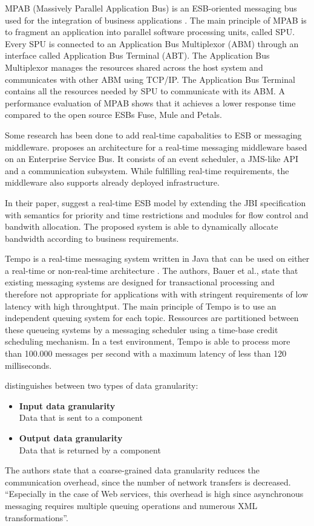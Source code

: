 MPAB (Massively Parallel Application Bus) is an ESB-oriented messaging bus used for the integration of business applications \citep{Benosman:2012zr}. The main principle of MPAB is to fragment an application into parallel software processing units, called SPU. Every SPU is connected to an Application Bus Multiplexor (ABM) through an interface called Application Bus Terminal (ABT). The Application Bus Multiplexor manages the resources shared across the host system and communicates with other ABM using TCP/IP. The Application Bus Terminal contains all the resources needed by SPU to communicate with its ABM. A performance evaluation of MPAB shows that it achieves a lower response time compared to the open source ESBs Fuse, Mule and Petals.

Some research has been done to add real-time capabalities to ESB or messaging middleware. \cite{Garces-Erice:2009kx} proposes an architecture for a real-time messaging middleware based on an Enterprise Service Bus. It consists of an event scheduler, a \ac{JMS}-like API and a communication subsystem. While fulfilling real-time requirements, the middleware also supports already deployed infrastructure.

In their paper, \cite{Xia:2011rt} suggest a real-time ESB model by extending the JBI specification with semantics for priority and time restrictions and modules for flow control and bandwith allocation. The proposed system is able to dynamically allocate bandwidth according to business requirements.

Tempo is a real-time messaging system written in Java that can be used on either a real-time or non-real-time architecture \citep{Bauer:2008fk}. The authors, Bauer et al., state that existing messaging systems are designed for transactional processing and therefore not appropriate for applications with with stringent requirements of low latency with high throughtput. The main principle of Tempo is to use an independent queuing system for each topic. Ressources are partitioned between these queueing systems by a messaging scheduler using a time-base credit scheduling mechanism. In a test environment, Tempo is able to process more than 100.000 messages per second with a maximum latency of less than 120 milliseconds.

\cite{Haesen:2008ve} distinguishes between two types of data granularity:
\begin{itemize}
	\item \textbf{Input data granularity}\\
	Data that is sent to a component
	\item \textbf{Output data granularity}\\
	Data that is returned by a component
\end{itemize}
The authors state that a coarse-grained data granularity reduces the communication overhead, since the number of network transfers is decreased.
``Especially in the case of Web services, this overhead is high since asynchronous messaging requires multiple queuing operations and numerous XML transformations''.

